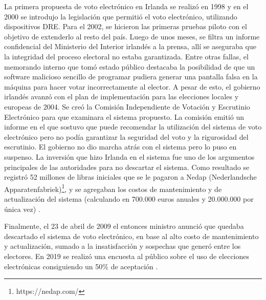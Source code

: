 La primera propuesta de voto electrónico en Irlanda se realizó en 1998 y en el 2000 se introdujo la legislación que permitió el voto electrónico, utilizando dispositivos DRE. Para el 2002, se hicieron las primeras pruebas piloto con el objetivo de extenderlo al resto del país. Luego de unos meses, se filtra un informe confidencial del Ministerio del Interior irlandés a la prensa, allí se aseguraba que la integridad del proceso electoral no estaba garantizada. Entre otras fallas, el memorando interno que tomó estado público destacaba la posibilidad de que un software malicioso sencillo de programar pudiera generar una pantalla falsa en la máquina para hacer votar incorrectamente al elector. A pesar de esto, el gobierno irlandés avanzó con el plan de implementación para las elecciones locales y europeas de 2004. Se creó la Comisión Independiente de Votación y Escrutinio Electrónico para que examinara el sistema propuesto. La comisión emitió un informe \cite{informeIrlanda} en el que sostuvo que puede recomendar la utilización del sistema de voto electrónico pero no podía garantizar la seguridad del voto y la rigurosidad del escrutinio. El gobierno no dio marcha atrás con el sistema pero lo puso en suspenso. La inversión que hizo Irlanda en el sistema fue uno de los argumentos principales de las autoridades para no descartar el sistema. Como resultado se registró 52 millones de libras iniciales que se le pagaron a Nedap (Nederlandsche Apparatenfabriek)\footnote{https://nedap.com/}, y se agregaban los costos de mantenimiento y de actualización del sistema (calculando en 700.000 euros anuales y 20.000.000 por única vez) \cite{libroVoto}.

Finalmente, el 23 de abril de 2009 el entonces ministro anunció que quedaba descartado el sistema de voto electrónico, en base al alto costo de mantenimiento y actualización, sumado a la insatisfacción y sospechas que generó entre los electores. En 2019 se realizó una encuesta al público sobre el uso de elecciones electrónicas consiguiendo un 50\% de aceptación \cite{eleccionesIrlanda}.
